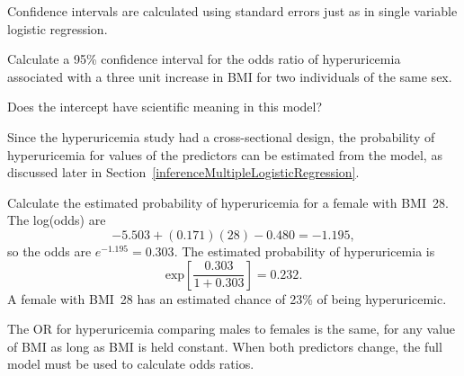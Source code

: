 Confidence intervals are calculated using standard errors just as in single variable logistic regression.

\begin{exercisewrap}
  \begin{nexercise}
    Calculate a 95\% confidence interval for the odds ratio of hyperuricemia associated with a three unit increase in BMI for two individuals of the same sex.     \footnotemark{}
  \end{nexercise}
\end{exercisewrap}

\begin{exercisewrap}
\begin{nexercise}
Does the intercept have scientific meaning in this model? \footnotemark{}
\end{nexercise}
\end{exercisewrap}

Since the hyperuricemia study had a cross-sectional design, the probability of hyperuricemia for values of the predictors can be estimated from the model, as discussed later in Section~\ref{inferenceMultipleLogisticRegression}.


\begin{examplewrap} 
\begin{nexample}{Calculate the estimated probability of hyperuricemia for a female with BMI~28.}
The log(odds) are
\[
    -5.503 + (0.171)(28)  - 0.480 = -1.195,
\]
so the odds are $e^{-1.195} = 0.303$.  The estimated probability of hyperuricemia is
\[
   \text{exp}  \left[ \frac{0.303}{1 + 0.303} \right] = 0.232.
\]
A female with BMI~28 has an estimated chance of 23\% of being hyperuricemic.

\label{example:huBMISexProbabilities}
\end{nexample}
\end{examplewrap}

The OR for hyperuricemia comparing males to females is the same, for any value of BMI as long as BMI is held constant. When both predictors change, the full model must be used to calculate odds ratios.

